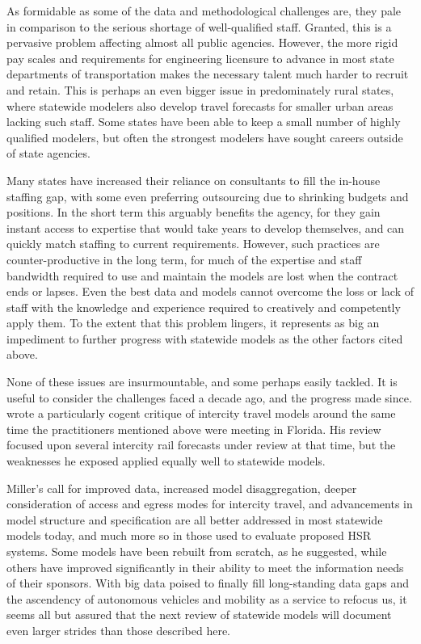 As formidable as some of the data and methodological challenges are, they pale in comparison to the serious shortage of well-qualified staff. Granted, this is a pervasive problem affecting almost all public agencies. However, the more rigid pay scales and requirements for engineering licensure to advance in most state departments of transportation makes the necessary talent much harder to recruit and retain. This is perhaps an even bigger issue in predominately rural states, where statewide modelers also develop travel forecasts for smaller urban areas lacking such staff. Some states have been able to keep a small number of highly qualified modelers, but often the strongest modelers have sought careers outside of state agencies.

Many states have increased their reliance on consultants to fill the in-house staffing gap, with some even preferring outsourcing due to shrinking budgets and positions. In the short term this arguably benefits the agency, for they gain instant access to expertise that would take years to develop themselves, and can quickly match staffing to current requirements. However, such practices are counter-productive in the long term, for much of the expertise and staff bandwidth required to use and maintain the models are lost when the contract ends or lapses. Even the best data and models cannot overcome the loss or lack of staff with the knowledge and experience required to creatively and competently apply them. To the extent that this problem lingers, it represents as big an impediment to further progress with statewide models as the other factors cited above.

None of these issues are insurmountable, and some perhaps easily tackled. It is useful to consider the challenges faced a decade ago, and the progress made since. \cite{miller04} wrote a particularly cogent critique of intercity travel models around the same time the practitioners mentioned above were meeting in Florida. His review focused upon several intercity rail forecasts under review at that time, but the weaknesses he exposed applied equally well to statewide models. 

Miller's call for improved data, increased model disaggregation, deeper consideration of access and egress modes for intercity travel, and advancements in model structure and specification are all better addressed in most statewide models today, and much more so in those used to evaluate proposed HSR systems. Some models have been rebuilt from scratch, as he suggested, while others have improved significantly in their ability to meet the information needs of their sponsors. With big data poised to finally fill long-standing data gaps and the ascendency of autonomous vehicles and mobility as a service to refocus us, it seems all but assured that the next review of statewide models will document even larger strides than those described here.
